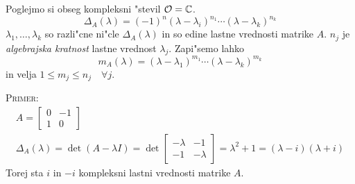 Poglejmo si obseg kompleksni "stevil $\mathcal{O} = \mathbb{C}$.
\begin{equation*}
\Delta_A(\lambda) = (-1)^n (\lambda - \lambda_i)^{n_1} \cdots (\lambda - \lambda_k)^{n_k}
\end{equation*}
$\lambda_1, \ldots, \lambda_k$ so razli"cne ni"cle $\Delta_A(\lambda)$ in so edine lastne vrednosti matrike $A$. $n_j$ je \emph{algebrajska kratnost} lastne vrednost $\lambda_j$. Zapi"semo lahko
\begin{equation*}
m_A(\lambda) = (\lambda - \lambda_1)^{m_1} \cdots (\lambda - \lambda_k)^{m_k}
\end{equation*}
in velja $1 \leq m_j \leq n_j \quad \forall j$.

\textsc{Primer:}
\begin{gather*}
A = \begin{bmatrix}
0 & -1 \\
1 & 0
\end{bmatrix}  \\
\Delta_A(\lambda) = \det (A - \lambda I) = \det \begin{bmatrix}
-\lambda & -1 \\
-1 & - \lambda
 \end{bmatrix} = \lambda^2 + 1 = (\lambda - i) (\lambda + i)
\end{gather*}
Torej sta $i$ in $-i$ kompleksni lastni vrednosti matrike $A$.